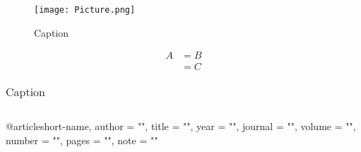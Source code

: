 
\begin{figure}[t]
\begin{center}
\texttt{[image: Picture.png]}
\caption{Caption}
\label{Label}
\end{center}
\end{figure}


\begin{equation}
\begin{split}
A &= B \\ &= C
\end{split}
\end{equation}


\begin{table}
\centering
\caption{Caption}
\label{Label}
\bgroup
\def\arraystretch{1.2}
\begin{tabular}{l|l}
\end{tabular}
\egroup
\end{table}


@article{short-name,
	author	= "",
    title	= "",
    year	= "",
    journal	= "",
    volume	= "",
    number	= "",
    pages	= "",
    note	= ""
}
